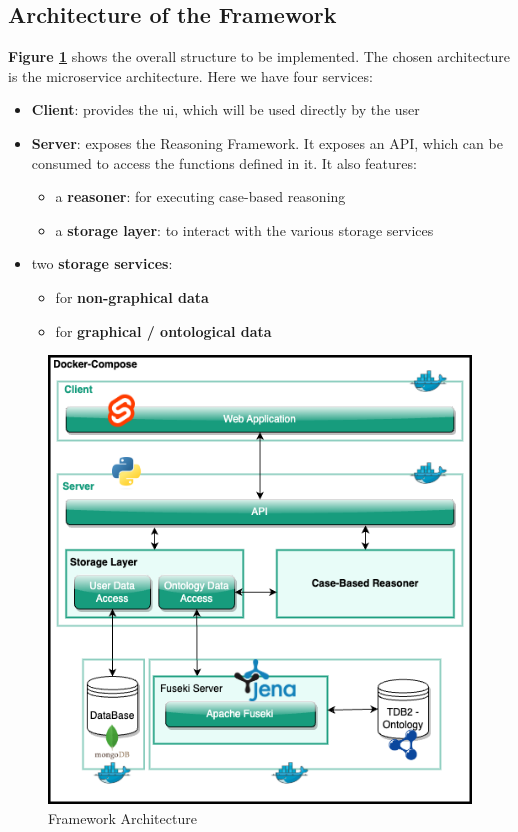 \subsection{Architecture of the Framework \label{subsec:archi-frame}}
\textbf{Figure \ref{fig:frame-archi}} shows the overall structure to be implemented. The chosen architecture is the microservice architecture. Here we have four services:
\begin{itemize}
    \item \textbf{Client}: provides the \acrfull{ui}, which will be used directly by the user
    \item \textbf{Server}: exposes the Reasoning Framework. It exposes an API, which can be consumed to access the functions defined in it. It also features:
        \begin{itemize}
            \item a \textbf{reasoner}: for executing case-based reasoning
            \item a \textbf{storage layer}: to interact with the various storage services
        \end{itemize}
    
    \item two \textbf{storage services}: 
        \begin{itemize}
            \item for \textbf{non-graphical data}
            \item for \textbf{graphical / ontological data}\\
        \end{itemize}
\end{itemize}


\begin{figure}[h]
\centering
\includegraphics[scale=0.6]{images/SemanticAssistant-Detailled Architecture.drawio.png}
\caption{\label{fig:frame-archi}  Framework Architecture}
\end{figure}


